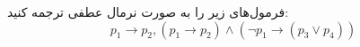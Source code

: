 فرمول‌های زیر را به صورت نرمال عطفی ترجمه کنید:
$$p_1\to p_2, (p_1\to p_2)\wedge (\neg p_1\to (p_3\vee p_4))$$
